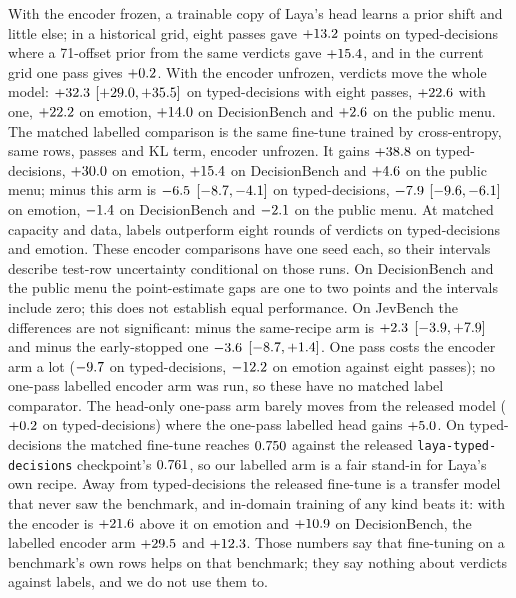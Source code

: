 With the encoder frozen, a trainable copy of Laya's head learns a prior shift and little else; in a historical grid, eight passes gave $+13.2$ points on typed-decisions where a 71-offset prior from the same verdicts gave $+15.4$, and in the current grid one pass gives $+0.2$. With the encoder unfrozen, verdicts move the whole model: $+32.3$ $[+29.0, +35.5]$ on typed-decisions with eight passes, $+22.6$ with one, $+22.2$ on emotion, $+14.0$ on DecisionBench and $+2.6$ on the public menu. The matched labelled comparison is the same fine-tune trained by cross-entropy, same rows, passes and KL term, encoder unfrozen. It gains $+38.8$ on typed-decisions, $+30.0$ on emotion, $+15.4$ on DecisionBench and $+4.6$ on the public menu; \pk{} minus this arm is $-6.5$ $[-8.7, -4.1]$ on typed-decisions, $-7.9$ $[-9.6, -6.1]$ on emotion, $-1.4$ on DecisionBench and $-2.1$ on the public menu. At matched capacity and data, labels outperform eight rounds of verdicts on typed-decisions and emotion. These encoder comparisons have one seed each, so their intervals describe test-row uncertainty conditional on those runs. On DecisionBench and the public menu the point-estimate gaps are one to two points and the intervals include zero; this does not establish equal performance. On JevBench the differences are not significant: \pk{} minus the same-recipe arm is $+2.3$ $[-3.9, +7.9]$ and minus the early-stopped one $-3.6$ $[-8.7, +1.4]$. One pass costs the encoder arm a lot ($-9.7$ on typed-decisions, $-12.2$ on emotion against eight passes); no one-pass labelled encoder arm was run, so these have no matched label comparator. The head-only one-pass arm barely moves from the released model ($+0.2$ on typed-decisions) where the one-pass labelled head gains $+5.0$.
On typed-decisions the matched fine-tune reaches $0.750$ against the released \texttt{laya-typed-decisions} checkpoint's $0.761$, so our labelled arm is a fair stand-in for Laya's own recipe. Away from typed-decisions the released fine-tune is a transfer model that never saw the benchmark, and in-domain training of any kind beats it: \pk{} with the encoder is $+21.6$ above it on emotion and $+10.9$ on DecisionBench, the labelled encoder arm $+29.5$ and $+12.3$. Those numbers say that fine-tuning on a benchmark's own rows helps on that benchmark; they say nothing about verdicts against labels, and we do not use them to.

